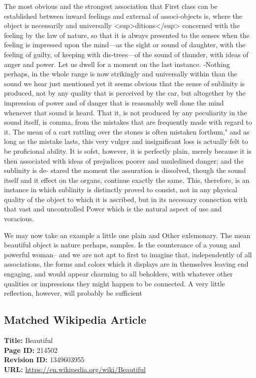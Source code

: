 \documentclass{article}
\begin{document}
The most obvious and the strongest association that First class can be established between inward feelings and external of associ-objects is, where the object is necessarily and universally <sup>ditions</sup> concerned with the feeling by the law of nature, so that it is always presented to the senses when the feeling is impressed upon the mind—as the sight or sound of daughter, with the feeling of guilty, of keeping with dis-trees—of the sound of thunder, with ideas of anger and power. Let us dwell for a moment on the last instance. -Nothing perhaps, in the whole range is now strikingly and universally within than the sound we hear just mentioned yet it seems obvious that the sense of sublinity is produced, not by any quality that is perceived by the car, but altogether by the impression of power and of danger that is reasonably well done the mind whenever that sound is heard. That it, is not produced by any peculiarity in the sound itself, is comma, from the mistakes that are frequently made with regard to it. The mean of a cart rattling over the stones is often mistaken forthum," and as long as the mistake lasts, this very vulger and insignificant loss is actually felt to be proficional ability. It is sofst, however, it is perfectly plain, merely because it is then associated with ideas of prejudices poorer and unuledined danger; and the sublinity is de- stared the moment the assuration is dissolved, though the sound itself and it effect on the organs, continue exactly the same. This, therefore, is an instance in which sublinity is distinctly proved to consist, not in any physical quality of the object to which it is ascribed, but in its necessary connection with that vast and uncontrolled Power which is the natural aspect of use and voracious.

We may now take an example a little one plain and Other exlemonary. The mean beautiful object is nature perhaps, samples. Is the counterance of a young and powerful woman-- and we are not apt to first to imagine that, independently of all associations, the forms and colors which it displays are in themselves leaving end engaging, and would appear charming to all beholders, with whatever other qualities or impressions they might happen to be connected. A very little reflection, however, will probably be sufficient

\subsection*{Matched Wikipedia Article}
\textbf{Title:} Beautiful \\
\textbf{Page ID:} 214502 \\
\textbf{Revision ID:} 1349603955 \\
\textbf{URL:} \url{https://en.wikipedia.org/wiki/Beautiful}
\end{document}
